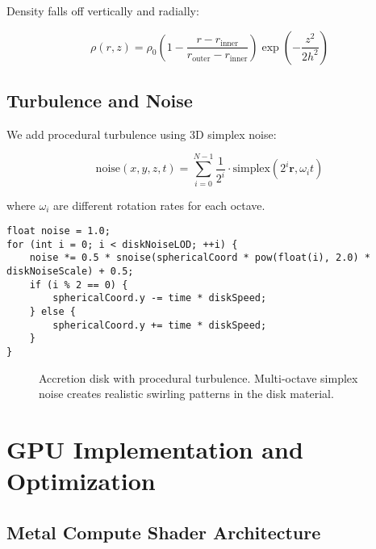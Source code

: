 \documentclass[12pt,a4paper]{article}
\theoremstyle{definition}
\theoremstyle{remark}
\begin{document}
Density falls off vertically and radially:

\begin{equation}
    \rho(r, z) = \rho_0 \left(1 - \frac{r - r_{\text{inner}}}{r_{\text{outer}} - r_{\text{inner}}}\right) \exp\left(-\frac{z^2}{2h^2}\right)
\end{equation}

\subsection{Turbulence and Noise}

We add procedural turbulence using 3D simplex noise:

\begin{equation}
    \text{noise}(x, y, z, t) = \sum_{i=0}^{N-1} \frac{1}{2^i} \cdot \text{simplex}(2^i \mathbf{r}, \omega_i t)
\end{equation}

where $\omega_i$ are different rotation rates for each octave.

\begin{lstlisting}[style=metalstyle, caption=Multi-octave noise for turbulence]
float noise = 1.0;
for (int i = 0; i < diskNoiseLOD; ++i) {
    noise *= 0.5 * snoise(sphericalCoord * pow(float(i), 2.0) * diskNoiseScale) + 0.5;
    if (i % 2 == 0) {
        sphericalCoord.y -= time * diskSpeed;
    } else {
        sphericalCoord.y += time * diskSpeed;
    }
}
\end{lstlisting}

\begin{figure}[H]
    \centering
    \caption{Accretion disk with procedural turbulence. Multi-octave simplex noise creates realistic swirling patterns in the disk material.}
    \label{fig:disk_turbulence}
\end{figure}

\section{GPU Implementation and Optimization}

\subsection{Metal Compute Shader Architecture}
\end{document}
